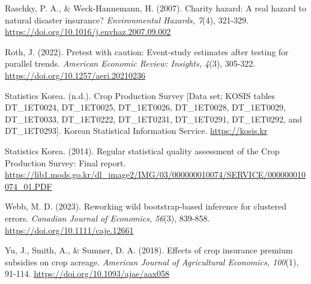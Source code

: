 \begin{wordreferences}
Raschky, P. A., \& Weck-Hannemann, H. (2007). Charity hazard: A real hazard to natural disaster insurance? \emph{Environmental Hazards, 7}(4), 321-329. \url{https://doi.org/10.1016/j.envhaz.2007.09.002}

Roth, J. (2022). Pretest with caution: Event-study estimates after testing for parallel trends. \emph{American Economic Review: Insights, 4}(3), 305-322. \url{https://doi.org/10.1257/aeri.20210236}

Statistics Korea. (n.d.). Crop Production Survey [Data set; KOSIS tables DT\_1ET0024, DT\_1ET0025, DT\_1ET0026, DT\_1ET0028, DT\_1ET0029, DT\_1ET0033, DT\_1ET0222, DT\_1ET0231, DT\_1ET0291, DT\_1ET0292, and DT\_1ET0293]. Korean Statistical Information Service. \url{https://kosis.kr}

Statistics Korea. (2014). Regular statistical quality assessment of the Crop Production Survey: Final report. \url{https://lib1.mods.go.kr/dl_image2/IMG/03/000000010074/SERVICE/000000010074_01.PDF}

Webb, M. D. (2023). Reworking wild bootstrap-based inference for clustered errors. \emph{Canadian Journal of Economics, 56}(3), 839-858. \url{https://doi.org/10.1111/caje.12661}

Yu, J., Smith, A., \& Sumner, D. A. (2018). Effects of crop insurance premium subsidies on crop acreage. \emph{American Journal of Agricultural Economics, 100}(1), 91-114. \url{https://doi.org/10.1093/ajae/aax058}
\end{wordreferences}

